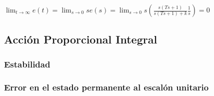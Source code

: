 \begin{math}
\displaystyle \lim_{t \to \infty} e(t) = \lim_{s \to 0} s e(s) = \lim_{s \to 0} s \left(\frac{s(Ts + 1)}{s(Ts + 1) + k} \frac{1}{s}\right) = 0
\end{math}

\subsection{Acción Proporcional Integral}
\subsubsection{Estabilidad}
\subsubsection{Error en el estado permanente al escalón unitario}

